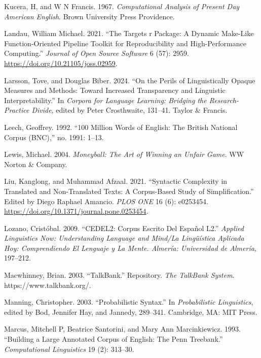 \documentclass[
  letterpaper,
]{latex/krantz}
\newlength{\cslhangindent}
\newenvironment{CSLReferences}[2] %
 {\begin{list}{}{%
  \setlength{\itemindent}{0pt}
  \setlength{\leftmargin}{0pt}
  \setlength{\parsep}{0pt}
  \ifodd #1
   \setlength{\leftmargin}{\cslhangindent}
   \setlength{\itemindent}{-1\cslhangindent}
  \fi
  \setlength{\itemsep}{#2\baselineskip}}}
 {\end{list}}
\theoremstyle{definition}
\theoremstyle{remark}
\begin{document}
\begin{CSLReferences}{1}{0}
Kucera, H, and W N Francis. 1967. \emph{Computational Analysis of
Present Day American English}. Brown University Press Providence.

Landau, William Michael. 2021. {``The Targets r Package: A Dynamic
Make-Like Function-Oriented Pipeline Toolkit for Reproducibility and
High-Performance Computing.''} \emph{Journal of Open Source Software} 6
(57): 2959. \url{https://doi.org/10.21105/joss.02959}.

Larsson, Tove, and Douglas Biber. 2024. {``On the Perils of
Linguistically Opaque Measures and Methods: Toward Increased
Transparency and Linguistic Interpretability.''} In \emph{Corpora for
Language Learning: Bridging the Research-Practice Divide}, edited by
Peter Crosthwaite, 131--41. Taylor \& Francis.

Leech, Geoffrey. 1992. {``100 Million Words of English: The British
National Corpus (BNC),''} no. 1991: 1--13.

Lewis, Michael. 2004. \emph{Moneyball: The Art of Winning an Unfair
Game}. WW Norton \& Company.

Liu, Kanglong, and Muhammad Afzaal. 2021. {``Syntactic Complexity in
Translated and Non-Translated Texts: A Corpus-Based Study of
Simplification.''} Edited by Diego Raphael Amancio. \emph{PLOS ONE} 16
(6): e0253454. \url{https://doi.org/10.1371/journal.pone.0253454}.

Lozano, Cristóbal. 2009. {``CEDEL2: Corpus Escrito Del Espa{ñ}ol L2.''}
\emph{Applied Linguistics Now: Understanding Language and Mind/La
Ling{ü}{í}stica Aplicada Hoy: Comprendiendo El Lenguaje y La Mente.
Almer{í}a: Universidad de Almer{í}a}, 197--212.

Macwhinney, Brian. 2003. {``TalkBank.''} Repository. \emph{The TalkBank
System}. https://www.talkbank.org/.

Manning, Christopher. 2003. {``Probabilistic Syntax.''} In
\emph{Probabilistic Linguistics}, edited by Bod, Jennifer Hay, and
Jannedy, 289--341. Cambridge, MA: MIT Press.

Marcus, Mitchell P, Beatrice Santorini, and Mary Ann Marcinkiewicz.
1993. {``Building a Large Annotated Corpus of English: The Penn
Treebank.''} \emph{Computational Linguistics} 19 (2): 313--30.


\end{CSLReferences}
\end{document}
